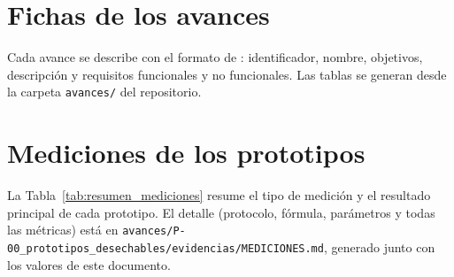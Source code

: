 \setcounter{chapter}{0}

\chapter{Fichas de los avances}
\label{ap:avances}

Cada avance se describe con el formato de \citet{figueroa2025}: identificador, nombre, objetivos, descripción y requisitos funcionales y no funcionales. Las tablas se generan desde la carpeta \texttt{avances/} del repositorio.

{\small}

\chapter{Mediciones de los prototipos}
\label{ap:mediciones}

La Tabla~\ref{tab:resumen_mediciones} resume el tipo de medición y el resultado principal de cada prototipo. El detalle (protocolo, fórmula, parámetros y todas las métricas) está en \texttt{avances/P-00\_prototipos\_desechables/evidencias/MEDICIONES.md}, generado junto con los valores de este documento.

